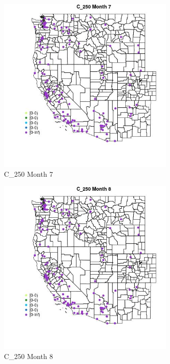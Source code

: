 \begin{figure} 
\centering  
\includegraphics[width=0.77\textwidth]{Code_Outputs/Report_ML_input_PM25_Step4_part_e_de_duplicated_aves_MapObsMo7C_250.jpg} 
\caption{\label{fig:Report_ML_input_PM25_Step4_part_e_de_duplicated_avesMapObsMo7C_250}C_250 Month 7} 
\end{figure} 
 

\begin{figure} 
\centering  
\includegraphics[width=0.77\textwidth]{Code_Outputs/Report_ML_input_PM25_Step4_part_e_de_duplicated_aves_MapObsMo8C_250.jpg} 
\caption{\label{fig:Report_ML_input_PM25_Step4_part_e_de_duplicated_avesMapObsMo8C_250}C_250 Month 8} 
\end{figure} 
 

